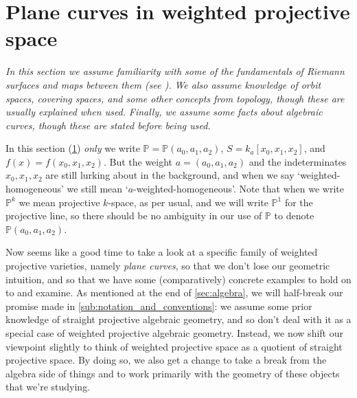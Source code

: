 \documentclass[10pt,notitlepage]{article}
\numberwithin{equation}{subsection}
\newcommand{\pee}{\mathbb{P}}
\newcommand{\kathree}{k_a[x_0,x_1,x_2]}
\newcommand{\pathree}{\pee(a_0,a_1,a_2)}
\newcommand{\poly}{S}
\begin{document}





\section{Plane curves in weighted projective space} %
\label{sec:curves_in_weighted_projective_space}

    \emph{In this section we assume familiarity with some of the fundamentals of Riemann surfaces and maps between them (see \cite[Chapters~1,~2]{Miranda:1995uz}).}
    \emph{We also assume knowledge of orbit spaces, covering spaces, and some other concepts from topology, though these are usually explained when used.}
    \emph{Finally, we assume some facts about algebraic curves, though these are stated before being used.}

    \bigskip

    \begin{note}
        In this section (\cref{sec:curves_in_weighted_projective_space}) \emph{only} we write $\pee=\pathree$, $\poly=\kathree$, and $f(x)=f(x_0,x_1,x_2)$.
        But the weight \mbox{$a=(a_0,a_1,a_2)$} and the indeterminates $x_0,x_1,x_2$ are still lurking about in the background, and when we say `weighted-homogeneous' we still mean `$a$-weighted-homogeneous'.
        Note that when we write $\pee^k$ we mean projective $k$-space, as per usual, and we will write $\pee^1$ for the projective line, so there should be no ambiguity in our use of $\pee$ to denote $\pee(a_0,a_1,a_2)$.
    \end{note}

    Now seems like a good time to take a look at a specific family of weighted projective varieties, namely \emph{plane curves}, so that we don't lose our geometric intuition, and so that we have some (comparatively) concrete examples to hold on to and examine.
    As mentioned at the end of \cref{sec:algebra}, we will half-break our promise made in \cref{sub:notation_and_conventions}: we assume some prior knowledge of straight projective algebraic geometry, and so don't deal with it as a special case of weighted projective algebraic geometry.
    Instead, we now shift our viewpoint slightly to think of weighted projective space as a quotient of straight projective space.
    By doing so, we also get a change to take a break from the algebra side of things and to work primarily with the geometry of these objects that we're studying.
\end{document}
